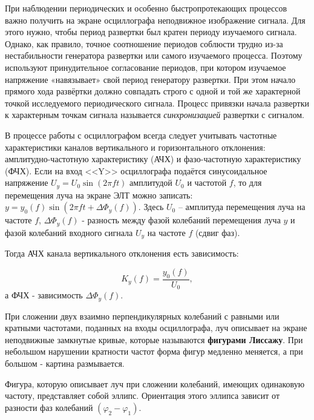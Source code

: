\documentclass[a4paper,12pt]{article} %
\begin{document}
	При наблюдении периодических и особенно быстропротекающих процессов важно получить на экране осциллографа неподвижное изображение сигнала. Для этого нужно, чтобы период развертки был кратен периоду изучаемого сигнала. Однако, как правило, точное соотношение периодов соблюсти трудно из-за нестабильности генератора развертки или самого изучаемого процесса. Поэтому используют принудительное согласование периодов, при котором изучаемое напряжение «навязывает» свой период генератору развертки. При этом начало прямого хода развёртки должно совпадать строго с одной и той же характерной точкой исследуемого периодического сигнала. Процесс привязки начала развертки к характерным точкам сигнала называется \textit{синхронизацией} развертки с сигналом.
	
	В процессе работы с осциллографом всегда следует учитывать частотные характеристики каналов вертикального и горизонтального отклонения: амплитудно-частотную характеристику (АЧХ) и фазо-­частотную характеристику (ФЧХ). Если на вход <<Y>> осциллографа подаётся синусоидальное напряжение $ U_y=U_0\sin\left(2\pi ft\right) $ амплитудой $ U_0 $ и частотой $ f $, то для перемещения луча на экране ЭЛТ можно записать: $ y=y_0\left(f\right)\sin\left(2\pi ft + \Delta\Phi_y\left(f\right)\right) $. Здесь $ U_0 $ -- амплитуда перемещения луча на частоте $ f $, $ \Delta\Phi_y\left(f\right) $ - разность между фазой колебаний перемещения луча $ y $ и фазой колебаний входного сигнала $ U_y $ на частоте $ f $ (сдвиг фаз).
	
	Тогда АЧХ канала вертикального отклонения есть зависимость:
	
	\begin{equation}
		K_y\left(f\right) = \frac{y_0\left(f\right)}{U_0}, \label{ahch}
	\end{equation}
	а ФЧХ - зависимость $ \Delta\Phi_y\left(f\right) $.
	
	При сложении двух взаимно перпендикулярных колебаний с равными или кратными частотами, поданных на входы осциллографа, луч описывает на экране неподвижные замкнутые кривые, которые называются \textbf{фигурами Лиссажу}. При небольшом нарушении кратности частот форма фигур медленно меняется, а при большом - картина размывается.
	
	Фигура, которую описывает луч при сложении колебаний, имеющих одинаковую частоту, представляет собой эллипс. Ориентация этого эллипса зависит от разности фаз колебаний $ \left(\varphi_2-\varphi_1\right) $.
	
\end{document}
